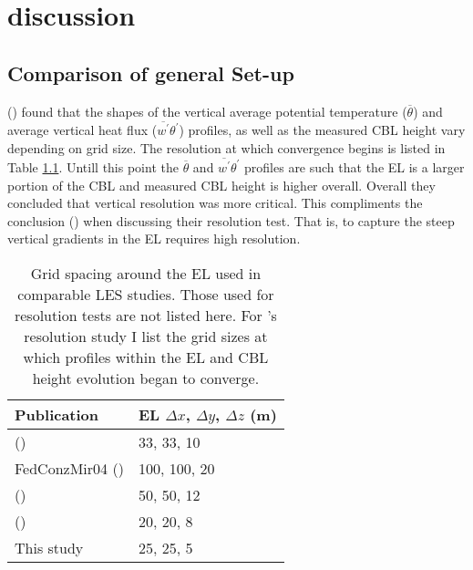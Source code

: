 
\chapter{discussion}
\label{ch:results}
\setlength{\parindent}{0cm}

\section{Comparison of general Set-up}
\FloatBarrier

\citeauthor{SullPat} (\citeyear{SullPat}) found that the shapes of the vertical average potential temperature ($\overline{\theta}$) and average vertical heat flux ($\overline{w^{'}}\theta^{'}$) profiles, as well as the measured \acs{CBL} height vary depending on grid size.  The resolution at which convergence begins is listed in Table \ref{table:gridcomp}.  Untill this point the $\overline{\theta}$ and $\overline{w^{'}}\theta^{'}$ profiles are such that the \acs{EL} is a larger portion of the \acs{CBL} and measured \acs{CBL} height is higher overall.  Overall they concluded that vertical resolution was more critical.  This compliments the conclusion \citeauthor{BrooksFowler2} (\citeyear{BrooksFowler2}) when discussing their resolution test.  That is, to capture the steep vertical gradients in the \acs{EL} requires high resolution.\\

\begin{table}[htbp]
    \begin{center}
    \begin{tabular}{ p{5cm} p{4cm}}
Publication & \acs{EL} $\Delta x$, $\Delta y$, $\Delta z$ (m)\\ \hline
      \citeauthor{SullMoengStev} (\citeyear{SullMoengStev}) & 33, 33, 10  \\ \hline 
      {FedConzMir04} (\citeyear{FedConzMir04}) & 100, 100, 20  \\ [.3cm] %
      \citeauthor{BrooksFowler2} (\citeyear{BrooksFowler2}) & 50, 50, 12\\ \hline
    \citeauthor{SullPat} (\citeyear{SullPat}) &  20, 20, 8  \\ \hline
    This study & 25, 25, 5\\ \hline 
      
    \end{tabular}
\caption[]{Grid spacing around the \acs{EL} used in comparable \acs{LES} studies. Those used for resolution tests are not listed here.  For \citeauthor{SullPat}'s \citeyear{SullPat} resolution study I list the grid sizes at which profiles within the \acs{EL} and \acs{CBL} height evolution began to converge.}
\label{table:gridcomp}   
\end{center}    
\end{table}

